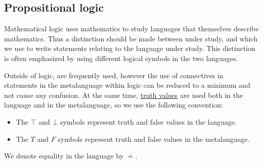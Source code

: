 \subsection{Propositional logic}\label{subsec:propositional_logic}

\begin{remark}\label{remark:metalanguage}
  Mathematical logic uses mathematics to study languages that themselves describe mathematics. Thus a distinction should be made between  under study, and  which we use to write statements relating to the language under study. This distinction is often emphasized by using different logical symbols in the two languages.

  Outside of logic,  are frequently used, however the use of connectives in statements in the metalanguage within logic can be reduced to a minimum and not cause any confusion. At the same time, \hyperref[def:propositional_language/constants]{truth values} are used both in the language and in the metalanguage, so we use the following convention:
  \begin{itemize}
    \item The \( \top \) and \( \bot \) symbols represent truth and false values in the language.
    \item The \( T \) and \( F \) symbols represent truth and false values in the metalanguage.
  \end{itemize}

  We denote equality in the language by \( \doteq \).
\end{remark}

